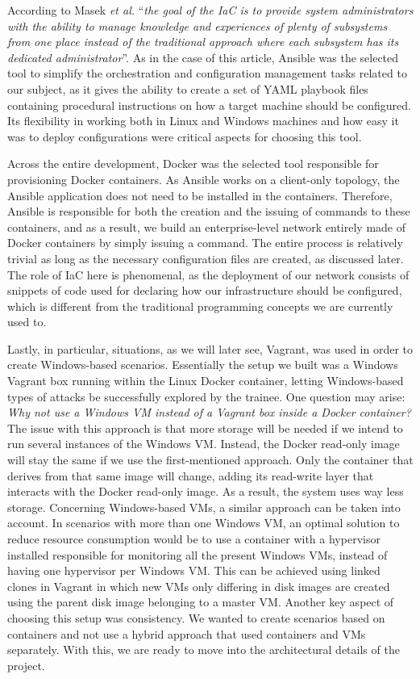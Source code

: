 According to Masek \textit{et al.} \cite{unleashing_full_potential_of_ansible_ref} ``\textit{the goal of the IaC is to provide system administrators with the ability to manage knowledge and experiences of plenty of subsystems from one place instead of the traditional approach where each subsystem has its dedicated administrator}''. As in the case of this article, Ansible was the selected tool to simplify the orchestration and configuration management tasks related to our subject, as it gives the ability to create a set of YAML playbook files containing procedural instructions on how a target machine should be configured. Its flexibility in working both in Linux and Windows machines and how easy it was to deploy configurations were critical aspects for choosing this tool. 

Across the entire development, Docker was the selected tool responsible for provisioning Docker containers. As Ansible works on a client-only topology, the Ansible application does not need to be installed in the containers. Therefore, Ansible is responsible for both the creation and the issuing of commands to these containers, and as a result, we build an enterprise-level network entirely made of Docker containers by simply issuing a command. The entire process is relatively trivial as long as the necessary configuration files are created, as discussed later. The role of IaC here is phenomenal, as the deployment of our network consists of snippets of code used for declaring how our infrastructure should be configured, which is different from the traditional programming concepts we are currently used to.

Lastly, in particular, situations, as we will later see, Vagrant, was used in order to create Windows-based scenarios. Essentially the setup we built was a Windows Vagrant box running within the Linux Docker container, letting Windows-based types of attacks be successfully explored by the trainee. One question may arise: \textit{Why not use a Windows VM instead of a Vagrant box inside a Docker container?} The issue with this approach is that more storage will be needed if we intend to run several instances of the Windows VM. Instead, the Docker read-only image will stay the same if we use the first-mentioned approach.
Only the container that derives from that same image will change, adding its read-write layer that interacts with the Docker read-only image. As a result, the system uses way less storage. Concerning Windows-based VMs, a similar approach can be taken into account. In scenarios with more than one Windows VM, an optimal solution to reduce resource consumption would be to use a container with a hypervisor installed responsible for monitoring all the present Windows VMs, instead of having one hypervisor per Windows VM. This can be achieved using linked clones in Vagrant in which new VMs only differing in disk images are created using the parent disk image belonging to a master VM. Another key aspect of choosing this setup was consistency. We wanted to create scenarios based on containers and not use a hybrid approach that used containers and VMs separately. With this, we are ready to move into the architectural details of the project.

